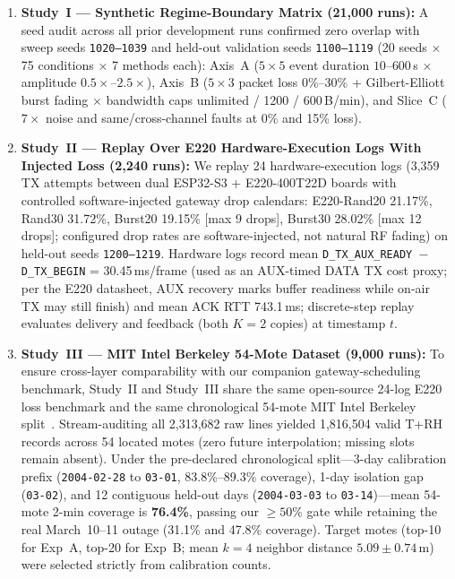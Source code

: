 \documentclass[journal,twoside,web]{ieeecolor}
\begin{document}
\begin{enumerate}
\item \textbf{Study~I --- Synthetic Regime-Boundary Matrix (21,000 runs):} A seed audit across all prior development runs confirmed zero overlap with sweep seeds \texttt{1020--1039} and held-out validation seeds \texttt{1100--1119} (20 seeds $\times$ 75 conditions $\times$ 7 methods each): Axis~A ($5\times 5$ event duration $10$--$600$\,s $\times$ amplitude $0.5\times$--$2.5\times$), Axis~B ($5\times 3$ packet loss $0\%$--$30\%$ + Gilbert-Elliott burst fading $\times$ bandwidth caps unlimited / 1200 / 600\,B/min), and Slice~C ($7\times$ noise and same/cross-channel faults at 0\% and 15\% loss).
\item \textbf{Study~II --- Replay Over E220 Hardware-Execution Logs With Injected Loss (2,240 runs):} We replay 24 hardware-execution logs (3,359 TX attempts between dual ESP32-S3 + E220-400T22D boards with controlled software-injected gateway drop calendars: E220-Rand20 21.17\%, Rand30 31.72\%, Burst20 19.15\% [max 9 drops], Burst30 28.02\% [max 12 drops]; configured drop rates are software-injected, not natural RF fading) on held-out seeds \texttt{1200--1219}. Hardware logs record mean \texttt{D\_TX\_AUX\_READY $-$ D\_TX\_BEGIN} = 30.45\,ms/frame (used as an AUX-timed DATA TX cost proxy; per the E220 datasheet, AUX recovery marks buffer readiness while on-air TX may still finish) and mean ACK RTT 743.1\,ms; discrete-step replay evaluates delivery and feedback (both $K{=}2$ copies) at timestamp $t$.
\item \textbf{Study~III --- MIT Intel Berkeley 54-Mote Dataset (9,000 runs):} To ensure cross-layer comparability with our companion gateway-scheduling benchmark, Study~II and Study~III share the same open-source 24-log E220 loss benchmark and the same chronological 54-mote MIT Intel Berkeley split~\cite{madden2004intel}. Stream-auditing all 2,313,682 raw lines yielded 1,816,504 valid T+RH records across 54 located motes (zero future interpolation; missing slots remain absent). Under the pre-declared chronological split---3-day calibration prefix (\texttt{2004-02-28} to \texttt{03-01}, 83.8\%--89.3\% coverage), 1-day isolation gap (\texttt{03-02}), and 12 contiguous held-out days (\texttt{2004-03-03} to \texttt{03-14})---mean 54-mote 2-min coverage is \textbf{76.4\%}, passing our $\ge 50\%$ gate while retaining the real March~10--11 outage (31.1\% and 47.8\% coverage). Target motes (top-10 for Exp~A, top-20 for Exp~B; mean $k{=}4$ neighbor distance $5.09 \pm 0.74$\,m) were selected strictly from calibration counts.

\end{enumerate}
\end{document}
